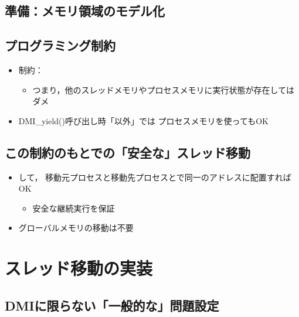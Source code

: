 \documentclass[25pt,papersize,landscape]{jsarticle}
\begin{document}
\subsection{準備：メモリ領域のモデル化}


\subsection{プログラミング制約}

\begin{itemize}
\item 制約：
  \begin{itemize}
  \item つまり，他のスレッドメモリやプロセスメモリに実行状態が存在してはダメ
  \end{itemize}
\item DMI\_yield()呼び出し時「以外」では
  プロセスメモリを使ってもOK
\end{itemize}

\subsection{この制約のもとでの「安全な」スレッド移動}


\begin{itemize}
\item {}して，
  移動元プロセスと移動先プロセスとで同一のアドレスに配置すればOK
  \begin{itemize}
  \item 安全な継続実行を保証
  \end{itemize}
\item グローバルメモリの移動は不要
\end{itemize}

\section{スレッド移動の実装}

\subsection{DMIに限らない「一般的な」問題設定}
\end{document}
